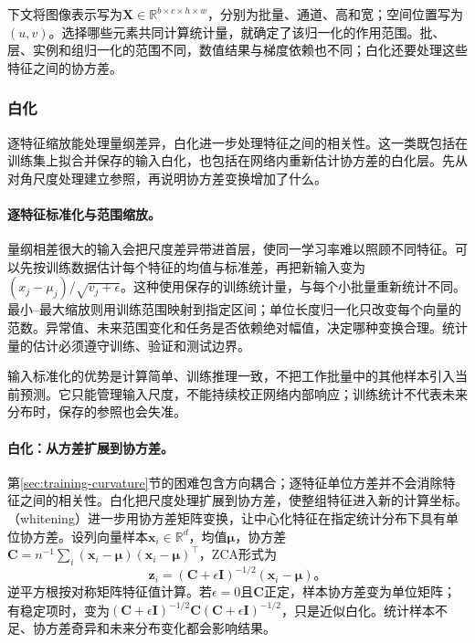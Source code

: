 下文将图像表示写为$\bm X\in\mathbb R^{b\times c\times h\times w}$，分别为批量、通道、高和宽；空间位置写为$(u,v)$。选择哪些元素共同计算统计量，就确定了该归一化的作用范围。批、层、实例和组归一化的范围不同，数值结果与梯度依赖也不同；白化还要处理这些特征之间的协方差。

\subsubsection{白化}
\label{sec:training-whitening}
\label{sec:training-input-scaling}
\label{sec:training-input-response-normalization}
\label{sec:training-other-whitening}
逐特征缩放能处理量纲差异，白化进一步处理特征之间的相关性。这一类既包括在训练集上拟合并保存的输入白化，也包括在网络内重新估计协方差的白化层。先从对角尺度处理建立参照，再说明协方差变换增加了什么。

\paragraph{逐特征标准化与范围缩放。}

量纲相差很大的输入会把尺度差异带进首层，使同一学习率难以照顾不同特征。可以先按训练数据估计每个特征的均值与标准差，再把新输入变为$(x_j-\mu_j)/\sqrt{v_j+\epsilon}$。这种使用保存的训练统计量，与每个小批量重新统计不同。最小--最大缩放则用训练范围映射到指定区间；单位长度归一化只改变每个向量的范数。异常值、未来范围变化和任务是否依赖绝对幅值，决定哪种变换合理。统计量的估计必须遵守训练、验证和测试边界。

输入标准化的优势是计算简单、训练推理一致，不把工作批量中的其他样本引入当前预测。它只能管理输入尺度，不能持续校正网络内部响应；训练统计不代表未来分布时，保存的参照也会失准。

\paragraph{白化：从方差扩展到协方差。}

第\ref{sec:training-curvature}节的困难包含方向耦合；逐特征单位方差并不会消除特征之间的相关性。白化把尺度处理扩展到协方差，使整组特征进入新的计算坐标。（whitening）进一步用协方差矩阵变换，让中心化特征在指定统计分布下具有单位协方差。设列向量样本$\bm x_i\in\mathbb R^d$，均值$\bm\mu$，协方差$\bm C=n^{-1}\sum_i(\bm x_i-\bm\mu)(\bm x_i-\bm\mu)^{\top}$，ZCA形式为
\begin{equation}
  \bm z_i=(\bm C+\epsilon\bm I)^{-1/2}(\bm x_i-\bm\mu)\text{。}
  \label{eq:training-whitening}
\end{equation}
逆平方根按对称矩阵特征值计算。若$\epsilon=0$且$\bm C$正定，样本协方差变为单位矩阵；有稳定项时，变为$(\bm C+\epsilon\bm I)^{-1/2}\bm C(\bm C+\epsilon\bm I)^{-1/2}$，只是近似白化。统计样本不足、协方差奇异和未来分布变化都会影响结果。

